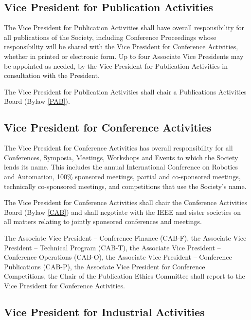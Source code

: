\documentclass[10pt]{article}
\newcommand{\blref}[1]{Bylaw \ref{#1}}
\begin{document}
\subsection{Vice President for Publication Activities}

The Vice President for Publication Activities shall have overall responsibility for all publications of the Society, including Conference Proceedings whose responsibility will be shared with the Vice President for Conference Activities, whether in printed or electronic form.  Up to four Associate Vice Presidents may be appointed as needed, by the Vice President for Publication Activities in consultation with the President. 

The Vice President for Publication Activities shall chair a Publications Activities Board (\blref{PAB}). 



\subsection{Vice President for Conference Activities}

The Vice President for Conference Activities has overall responsibility for all Conferences, Symposia, Meetings, Workshops and Events to which the Society lends its name. This includes the annual International Conference on Robotics and Automation, 100\% sponsored meetings, partial and co-sponsored meetings, technically co-sponsored meetings, and competitions that use the Society's name. 

The Vice President for Conference Activities shall chair the Conference Activities Board (\blref{CAB}) and shall negotiate with the IEEE and sister societies on all matters relating to jointly sponsored conferences and meetings.  

The Associate Vice President – Conference Finance (CAB-F), the Associate Vice President – Technical Program (CAB-T), the Associate Vice President – Conference Operations (CAB-O), the Associate Vice President – Conference Publications (CAB-P), the Associate Vice President for Conference Competitions, the Chair of the Publication Ethics Committee shall report to the Vice President for Conference Activities.



\subsection{Vice President for Industrial Activities}
\end{document}
